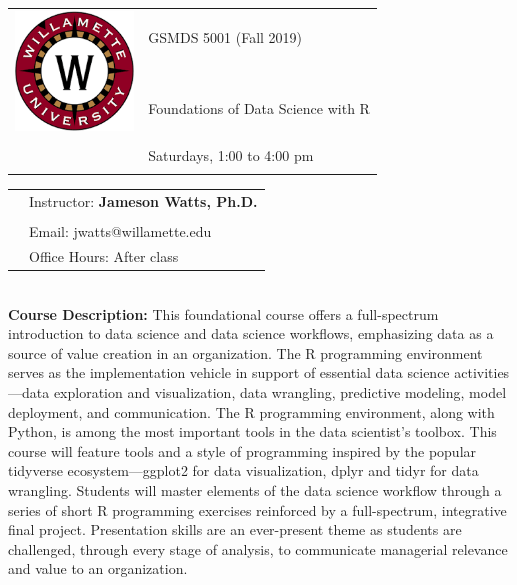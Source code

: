 \documentclass[11pt]{article}
\begin{document}
\begin{tabular}{ l l }
  \multirow{3}{*}{\includegraphics[height=1.25in]{logo.png}} & \LARGE GSMDS 5001 (Fall 2019) \\\\
  &\large Foundations of Data Science with R \\\\
  & \large Saturdays, 1:00 to 4:00 pm\\\\
\end{tabular}
\vspace{10mm}

\begin{tabular}{ l l }
  & \large Instructor: \textbf{Jameson Watts, Ph.D.} \\\\
  & \large Email: jwatts@willamette.edu \\
  & \large Office Hours: After class \\
\end{tabular}
\vspace{5mm}


\textbf {\large \\ Course Description:} This foundational course offers a full-spectrum introduction to data science and data science workflows, emphasizing data as a source of value creation in an organization. The R programming environment serves as the implementation vehicle in support of essential data science activities---data exploration and visualization, data wrangling, predictive modeling, model deployment, and communication. The R programming environment, along with Python, is among the most important tools in the data scientist's toolbox. This course will feature tools and a style of programming inspired by the popular tidyverse ecosystem---ggplot2 for data visualization, dplyr and tidyr for data wrangling. Students will master elements of the data science workflow through a series of short R programming exercises reinforced by a full-spectrum, integrative final project. Presentation skills are an ever-present theme as students are challenged, through every stage of analysis, to communicate managerial relevance and value to an organization. \\
\end{document}
